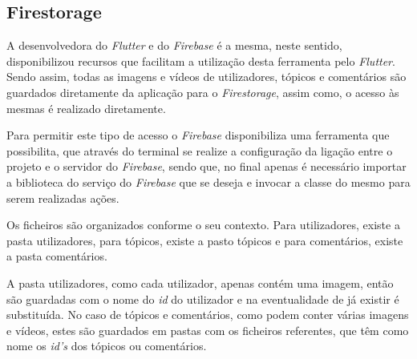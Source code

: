 \subsection{Firestorage}

A desenvolvedora do \textit{Flutter} e do \textit{Firebase} é a mesma, neste sentido, disponibilizou recursos que facilitam a utilização desta ferramenta pelo \textit{Flutter}. Sendo assim, todas as imagens e vídeos de utilizadores, tópicos e comentários são guardados diretamente da aplicação para o \textit{Firestorage}, assim como, o acesso às mesmas é realizado diretamente.

Para permitir este tipo de acesso o \textit{Firebase} disponibiliza uma ferramenta que possibilita, que através do terminal se realize a configuração da ligação entre o projeto e o servidor do \textit{Firebase}, sendo que, no final apenas é necessário importar a biblioteca do serviço do \textit{Firebase} que se deseja e invocar a classe do mesmo para serem realizadas ações.

Os ficheiros são organizados conforme o seu contexto. Para utilizadores, existe a pasta utilizadores, para tópicos, existe a pasto tópicos e para comentários, existe a pasta comentários. 


A pasta utilizadores, como cada utilizador, apenas contém uma imagem, então são guardadas com o nome do \textit{id} do utilizador e na eventualidade de já existir é substituída. No caso de tópicos e comentários, como podem conter várias imagens e vídeos, estes são guardados em pastas com os ficheiros referentes, que têm como nome os \emph{id's} dos tópicos ou comentários.

\begin{figure}[htb]%
 \centering
 \qquad
 \label{fig:76}%
\end{figure}